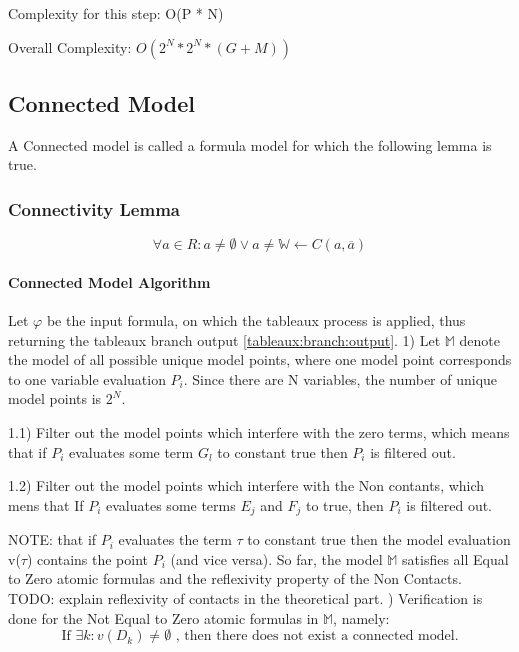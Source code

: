 \documentclass{article}
\begin{document}
				Complexity for this step: O(P * N)
				\newline
				\newline

				Overall Complexity: $O(2^N * 2^N * (G+M))$

	\newpage
	\subsection{Connected Model}
		A Connected model is called a formula model for which the following lemma is true.
		\subsubsection*{Connectivity Lemma}
		\begin{equation}
			\forall a \in R: a \neq \emptyset \vee a \neq \mathbb{W} \leftarrow C(a, \overline{a})
		\end{equation}
		\paragraph{Connected Model Algorithm}
		Let $\varphi$ be the input formula, on which the tableaux process is applied, thus returning the tableaux branch output \ref{tableaux:branch:output}.
		1) Let $\mathbb{M}$ denote the model of all possible unique model points, where one model point corresponds to 
			one variable evaluation $P_i$. 
			\newline
			Since there are N variables, the number of unique model points is $2^N$.
			\newline

			1.1) Filter out the model points which interfere with the zero terms, 
			which means that if $P_i$ evaluates some term $G_l$ to constant true then $P_i$ is filtered out.
			\newline

			1.2) Filter out the model points which interfere with the Non contants, which mens that 
				If $P_i$ evaluates some terms $E_j$ and $F_j$ to true, then $P_i$ is filtered out.
			\newline

			NOTE: that if $P_i$ evaluates the term $\tau$ to constant true then the model 
			evaluation v($\tau$) contains the point $P_i$ (and vice versa).
			\newline
			\newline
		So far, the model $\mathbb{M}$ satisfies all Equal to Zero atomic formulas and 
		the reflexivity property of the Non Contacts.
		\newline TODO: explain reflexivity of contacts in the theoretical part.
			\newline
			) Verification is done for the Not Equal to Zero atomic formulas in $\mathbb{M}$, namely:
			\begin{equation}
				\text{If  } \exists k: v(D_k) \neq \emptyset \text{ , then there does not exist a connected model.}
			\end{equation}
\end{document}
